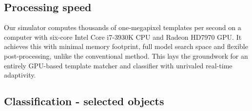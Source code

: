 \subsection{Processing speed}

%


Our simulator computes thousands of one-megapixel templates per second on a computer with six-core Intel Core i7-3930K CPU and Radeon HD7970 GPU. It achieves this with minimal memory footprint, full model search space and flexible post-processing, unlike the conventional method. This lays the groundwork for an entirely GPU-based template matcher and classifier with unrivaled real-time adaptivity.






\subsection{Classification - selected objects}

